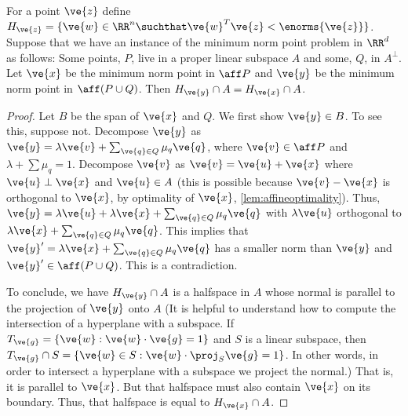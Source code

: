 \begin{lemma}\label{lem:secondround}
For a point $\ve{z}$ define $H_{\ve{z}}=\{\ve{w} \in \RR^n \suchthat \ve{w}^T \ve{z} < \enorms{\ve{z}} \}$.
Suppose that we have an instance of the minimum norm point problem in $\RR^d$ as follows: 
Some points, $P$, live in a proper linear subspace $A$ and some, $Q$, in $A^\perp$. 
Let $\ve{x}$ be the minimum norm point in $\aff P$ and $\ve{y}$ be the minimum norm point in $\aff(P \cup Q)$. Then $H_{\ve{y}} \cap A = H_{\ve{x}} \cap A$.
\end{lemma}
\begin{proof}
Let $B$ be the span of $\ve{x}$ and $Q$. We first show $\ve{y} \in B$. 
To see this, suppose not. 
Decompose $\ve{y}$ as $\ve{y}=\lambda \ve{v} + \sum_{\ve{q} \in Q} \mu_q \ve{q}$, where $\ve{v} \in \aff P$ and $\lambda + \sum \mu_q = 1$.
Decompose $\ve{v}$ as $\ve{v} = \ve{u} + \ve{x}$ where $\ve{u} \perp \ve{x}$ and $\ve{u} \in A$ (this is possible because $\ve{v}-\ve{x}$ is orthogonal to $\ve{x}$, by optimality of $\ve{x}$, \cref{lem:affineoptimality}).
Thus, $\ve{y} = \lambda \ve{u} + \lambda \ve{x} + \sum_{\ve{q} \in Q} \mu_q \ve{q}$ with $\lambda \ve{u}$ orthogonal to $\lambda \ve{x} + \sum_{\ve{q} \in Q} \mu_q \ve{q}$.
This implies that $\ve{y}' = \lambda \ve{x} + \sum_{\ve{q} \in Q} \mu_q \ve{q}$ has a smaller norm than $\ve{y}$ and $\ve{y}' \in \aff (P \cup Q)$. 
This is a contradiction.

To conclude, we have $H_{\ve{y}} \cap A$ is a halfspace in $A$ whose normal is parallel to the projection of $\ve{y}$ onto $A$
(It is helpful to understand how to compute the intersection of a hyperplane with a subspace. 
If $T_{\ve{g}} = \{\ve{w} : \ve{w} \cdot \ve{g} = 1\}$ and $S$ is a linear subspace, then $T_{\ve{g}} \cap S = \{\ve{w} \in S : \ve{w} \cdot \proj_S \ve{g} = 1 \}$. 
In other words, in order to intersect a hyperplane with a subspace we project the normal.) 
That is, it is parallel to $\ve{x}$. 
But that halfspace must also contain $\ve{x}$ on its boundary.
Thus, that halfspace is equal to $H_{\ve{x}} \cap A$.
\end{proof}




